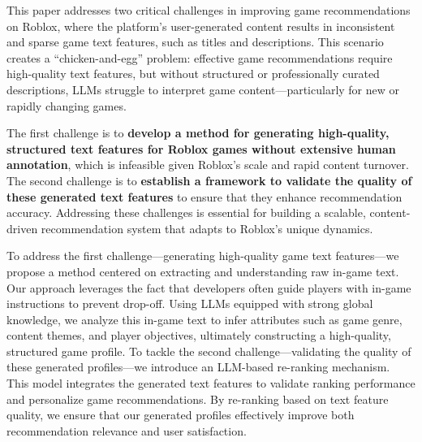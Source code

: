 This paper addresses two critical challenges in improving game recommendations on Roblox, where the platform’s user-generated content results in inconsistent and sparse game text features, such as titles and descriptions. This scenario creates a “chicken-and-egg” problem: effective game recommendations require high-quality text features, but without structured or professionally curated descriptions, LLMs struggle to interpret game content—particularly for new or rapidly changing games.

The first challenge is to \textbf{develop a method for generating high-quality, structured text features for Roblox games without extensive human annotation}, which is infeasible given Roblox’s scale and rapid content turnover. The second challenge is to \textbf{establish a framework to validate the quality of these generated text features} to ensure that they enhance recommendation accuracy. Addressing these challenges is essential for building a scalable, content-driven recommendation system that adapts to Roblox's unique dynamics.

To address the first challenge—generating high-quality game text features—we propose a method centered on extracting and understanding raw in-game text. Our approach leverages the fact that developers often guide players with in-game instructions to prevent drop-off. Using LLMs equipped with strong global knowledge, we analyze this in-game text to infer attributes such as game genre, content themes, and player objectives, ultimately constructing a high-quality, structured game profile. To tackle the second challenge—validating the quality of these generated profiles—we introduce an LLM-based re-ranking mechanism. This model integrates the generated text features to validate ranking performance and personalize game recommendations. By re-ranking based on text feature quality, we ensure that our generated profiles effectively improve both recommendation relevance and user satisfaction.


